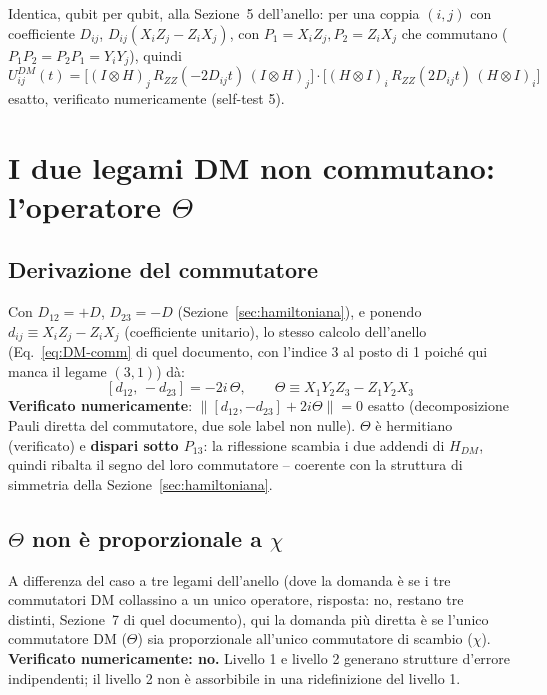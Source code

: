 \documentclass[11pt,a4paper]{article}
\begin{document}
Identica, qubit per qubit, alla Sezione~5 dell'anello: per una coppia $(i,j)$ con coefficiente $D_{ij}$, $D_{ij}(X_iZ_j-Z_iX_j)$, con $P_1=X_iZ_j,P_2=Z_iX_j$ che commutano ($P_1P_2=P_2P_1=Y_iY_j$), quindi
\begin{equation}
\boxed{U_{ij}^{DM}(t) = \big[(I\otimes H)_j\,R_{ZZ}(-2D_{ij}t)\,(I\otimes H)_j\big]\cdot\big[(H\otimes I)_i\,R_{ZZ}(2D_{ij}t)\,(H\otimes I)_i\big]}
\label{eq:UDM-bond}
\end{equation}
esatto, verificato numericamente (self-test 5).

\section{I due legami DM non commutano: l'operatore $\Theta$}
\label{sec:DM-noncomm}

\subsection{Derivazione del commutatore}

Con $D_{12}=+D$, $D_{23}=-D$ (Sezione~\ref{sec:hamiltoniana}), e ponendo $d_{ij}\equiv X_iZ_j-Z_iX_j$ (coefficiente unitario), lo stesso calcolo dell'anello (Eq.~\eqref{eq:DM-comm} di quel documento, con l'indice 3 al posto di 1 poiché qui manca il legame $(3,1)$) dà:
\begin{equation}
\boxed{[d_{12},\,-d_{23}] = -2i\,\Theta, \qquad \Theta\equiv X_1Y_2Z_3-Z_1Y_2X_3}
\label{eq:DM-comm}
\end{equation}
\textbf{Verificato numericamente}: $\|[d_{12},-d_{23}]+2i\Theta\|=0$ esatto (decomposizione Pauli diretta del commutatore, due sole label non nulle). $\Theta$ è hermitiano (verificato) e \textbf{dispari sotto $P_{13}$}: la riflessione scambia i due addendi di $H_{DM}$, quindi ribalta il segno del loro commutatore -- coerente con la struttura di simmetria della Sezione~\ref{sec:hamiltoniana}.

\subsection{$\Theta$ non è proporzionale a $\chi$}

A differenza del caso a tre legami dell'anello (dove la domanda è se i tre commutatori DM collassino a un unico operatore, risposta: no, restano tre distinti, Sezione~7 di quel documento), qui la domanda più diretta è se l'unico commutatore DM ($\Theta$) sia proporzionale all'unico commutatore di scambio ($\chi$). \textbf{Verificato numericamente: no.} Livello 1 e livello 2 generano strutture d'errore indipendenti; il livello 2 non è assorbibile in una ridefinizione del livello 1.
\end{document}
